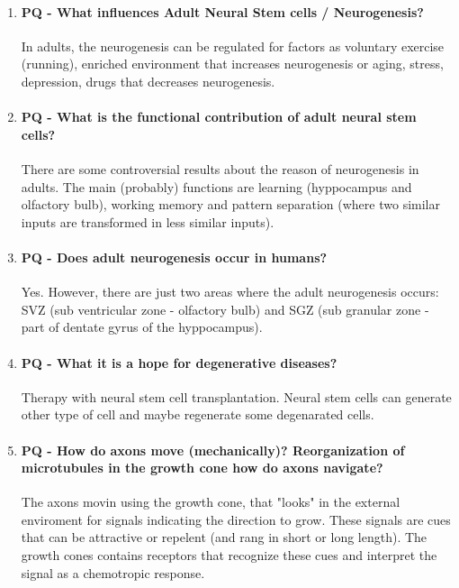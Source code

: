 \documentclass[12pt,article,oneside,a4paper]{memoir}
\begin{document}
\begin{enumerate}
\item \paragraph{PQ - What influences Adult Neural Stem cells / Neurogenesis?}
In adults, the neurogenesis can be regulated for factors as voluntary exercise (running), enriched environment that increases neurogenesis or aging, stress, depression, drugs that decreases neurogenesis.

\item \paragraph{PQ - What is the functional contribution of adult neural stem cells?}
There are some controversial results about the reason of neurogenesis in adults. The main (probably) functions are learning (hyppocampus and olfactory bulb), working memory and pattern separation (where two similar inputs are transformed in less similar inputs).

\item \paragraph{PQ - Does adult neurogenesis occur in humans?}
Yes. However, there are just two areas where the adult neurogenesis occurs: SVZ (sub ventricular zone - olfactory bulb) and SGZ (sub granular zone - part of dentate gyrus of the hyppocampus).

\item \paragraph{PQ - What it is a hope for degenerative diseases?} Therapy with neural stem cell transplantation. Neural stem cells can generate other type of cell and maybe regenerate some degenarated cells.

\item \paragraph{PQ - How do axons move (mechanically)? Reorganization of microtubules in the growth cone how do axons navigate?}
The axons movin using the growth cone, that "looks" in the external enviroment for signals indicating the direction to grow. These signals are cues that can be attractive or repelent (and rang in short or long length). The growth cones contains receptors that recognize these cues and interpret the signal as a chemotropic response.


\end{enumerate}
\end{document}
